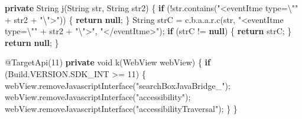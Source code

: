 \documentclass[
]{article}
\newenvironment{Shaded}{}{}
\newcommand{\AttributeTok}[1]{\textcolor[rgb]{0.49,0.56,0.16}{#1}}
\newcommand{\BuiltInTok}[1]{\textcolor[rgb]{0.00,0.50,0.00}{#1}}
\newcommand{\ControlFlowTok}[1]{\textcolor[rgb]{0.00,0.44,0.13}{\textbf{#1}}}
\newcommand{\DataTypeTok}[1]{\textcolor[rgb]{0.56,0.13,0.00}{#1}}
\newcommand{\DecValTok}[1]{\textcolor[rgb]{0.25,0.63,0.44}{#1}}
\newcommand{\FunctionTok}[1]{\textcolor[rgb]{0.02,0.16,0.49}{#1}}
\newcommand{\KeywordTok}[1]{\textcolor[rgb]{0.00,0.44,0.13}{\textbf{#1}}}
\newcommand{\NormalTok}[1]{#1}
\newcommand{\OperatorTok}[1]{\textcolor[rgb]{0.40,0.40,0.40}{#1}}
\newcommand{\SpecialCharTok}[1]{\textcolor[rgb]{0.25,0.44,0.63}{#1}}
\newcommand{\StringTok}[1]{\textcolor[rgb]{0.25,0.44,0.63}{#1}}
\begin{document}
\begin{Shaded}
\begin{Highlighting}[]
    \KeywordTok{private} \BuiltInTok{String} \FunctionTok{j}\OperatorTok{(}\BuiltInTok{String}\NormalTok{ str}\OperatorTok{,} \BuiltInTok{String}\NormalTok{ str2}\OperatorTok{)} \OperatorTok{\{}
        \ControlFlowTok{if} \OperatorTok{(!}\NormalTok{str}\OperatorTok{.}\FunctionTok{contains}\OperatorTok{(}\StringTok{"\textless{}eventItme type=}\SpecialCharTok{\textbackslash{}"}\StringTok{"} \OperatorTok{+}\NormalTok{ str2 }\OperatorTok{+} \StringTok{"}\SpecialCharTok{\textbackslash{}"}\StringTok{\textgreater{}"}\OperatorTok{))} \OperatorTok{\{}
            \ControlFlowTok{return} \KeywordTok{null}\OperatorTok{;}
        \OperatorTok{\}}
        \BuiltInTok{String}\NormalTok{ strC }\OperatorTok{=}\NormalTok{ c}\OperatorTok{.}\FunctionTok{b}\OperatorTok{.}\FunctionTok{a}\OperatorTok{.}\FunctionTok{a}\OperatorTok{.}\FunctionTok{r}\OperatorTok{.}\FunctionTok{c}\OperatorTok{(}\NormalTok{str}\OperatorTok{,} \StringTok{"\textless{}eventItme type=}\SpecialCharTok{\textbackslash{}"}\StringTok{"} \OperatorTok{+}\NormalTok{ str2 }\OperatorTok{+} \StringTok{"}\SpecialCharTok{\textbackslash{}"}\StringTok{\textgreater{}"}\OperatorTok{,} \StringTok{"\textless{}/eventItme\textgreater{}"}\OperatorTok{);}
        \ControlFlowTok{if} \OperatorTok{(}\NormalTok{strC }\OperatorTok{!=} \KeywordTok{null}\OperatorTok{)} \OperatorTok{\{}
            \ControlFlowTok{return}\NormalTok{ strC}\OperatorTok{;}
        \OperatorTok{\}}
        \ControlFlowTok{return} \KeywordTok{null}\OperatorTok{;}
    \OperatorTok{\}}

    \AttributeTok{@TargetApi}\OperatorTok{(}\DecValTok{11}\OperatorTok{)}
    \KeywordTok{private} \DataTypeTok{void} \FunctionTok{k}\OperatorTok{(}\NormalTok{WebView webView}\OperatorTok{)} \OperatorTok{\{}
        \ControlFlowTok{if} \OperatorTok{(}\NormalTok{Build}\OperatorTok{.}\FunctionTok{VERSION}\OperatorTok{.}\FunctionTok{SDK\_INT} \OperatorTok{\textgreater{}=} \DecValTok{11}\OperatorTok{)} \OperatorTok{\{}
\NormalTok{            webView}\OperatorTok{.}\FunctionTok{removeJavascriptInterface}\OperatorTok{(}\StringTok{"searchBoxJavaBridge\_"}\OperatorTok{);}
\NormalTok{            webView}\OperatorTok{.}\FunctionTok{removeJavascriptInterface}\OperatorTok{(}\StringTok{"accessibility"}\OperatorTok{);}
\NormalTok{            webView}\OperatorTok{.}\FunctionTok{removeJavascriptInterface}\OperatorTok{(}\StringTok{"accessibilityTraversal"}\OperatorTok{);}
        \OperatorTok{\}}
    \OperatorTok{\}}


\end{Highlighting}
\end{Shaded}
\end{document}
